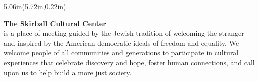 \documentclass[10pt,letterpaper,landscape]{article}
\newenvironment{acpanel}[2]{%
  \begin{textblock*}{5.06in}(#1,#2)%
    \begin{minipage}[t][8.06in][t]{5.06in}%
      \raggedright%
}{%
    \end{minipage}%
  \end{textblock*}%
}
\newcommand{\biochip}[2]{%
\begingroup
\setlength{\fboxsep}{1.5pt}%
\noindent\colorbox{black!4}{%
\parbox{\dimexpr\linewidth-2\fboxsep\relax}{%
{\fontsize{6.2}{6.8}\selectfont\textbf{#1}}\\[-0.14em]
{\fontsize{5.1}{5.75}\selectfont #2}
}}\vspace{0.038in}
\endgroup
}
\newcommand{\biomini}[2]{\biochip{#1}{#2}}
\begin{document}
\begin{acpanel}{5.72in}{0.22in}
\biomini{The Skirball Cultural Center}{is a place of meeting guided by the Jewish tradition of welcoming the stranger and inspired by the American democratic ideals of freedom and equality. We welcome people of all communities and generations to participate in cultural experiences that celebrate discovery and hope, foster human connections, and call upon us to help build a more just society.}
\end{acpanel}
\end{document}
